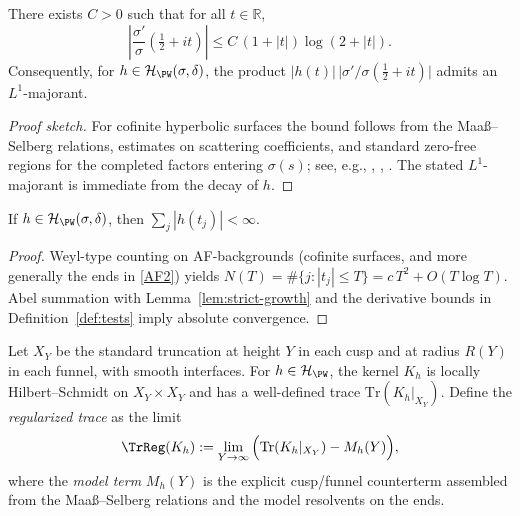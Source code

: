 
\begin{lemma}
\label{lem:strict-growth}
There exists $C>0$ such that for all $t\in\mathbb{R}$,
\[
\left|\frac{\sigma'}{\sigma}\!\left(\tfrac12+it\right)\right|
\le C\,(1+|t|)\log(2+|t|).
\]
Consequently, for $h\in\mathcal{H}_{\PW}(\sigma,\delta)$, the product
$|h(t)|\,\big|\sigma'/\sigma(\tfrac12+it)\big|$ admits an $L^1$-majorant. 
\end{lemma}

\begin{proof}[Proof sketch]
For cofinite hyperbolic surfaces the bound follows from the Maaß–Selberg
relations, estimates on scattering coefficients, and standard zero-free
regions for the completed factors entering $\sigma(s)$; see, e.g.,
\cite[Ch.~9]{HejhalII}, \cite[Ch.~7]{IwaniecSpectral}, \cite{Borthwick}.
The stated $L^1$-majorant is immediate from the decay of $h$.             %
\end{proof}

\begin{proposition}
\label{prop:abs-sum}
If $h\in\mathcal{H}_{\PW}(\sigma,\delta)$, then $\sum_j |h(t_j)|<\infty$.
\end{proposition}

\begin{proof}
Weyl-type counting on AF-backgrounds (cofinite surfaces, and more
generally the ends in \ref{AF2}) yields
$N(T)=\#\{j:|t_j|\le T\}=c\,T^2+O(T\log T)$. Abel summation with
Lemma~\ref{lem:strict-growth} and the derivative bounds in
Definition~\ref{def:tests} imply absolute convergence.                     %
\end{proof}


\begin{definition}\label{def:reg-trace}
Let $X_Y$ be the standard truncation at height $Y$ in each cusp and at
radius $R(Y)$ in each funnel, with smooth interfaces. For
$h\in\mathcal{H}_{\PW}$, the kernel $K_h$ is locally Hilbert–Schmidt on
$X_Y\times X_Y$ and has a well-defined trace $\mathrm{Tr}(K_h|_{X_Y})$.
Define the \emph{regularized trace} as the limit
\[
\TrReg(K_h):=\lim_{Y\to\infty}\Big(\mathrm{Tr}(K_h|_{X_Y})-M_h(Y)\Big),
\]
where the \emph{model term} $M_h(Y)$ is the explicit cusp/funnel
counterterm assembled from the Maaß–Selberg relations and the model
resolvents on the ends.                                                      %
\end{definition}

